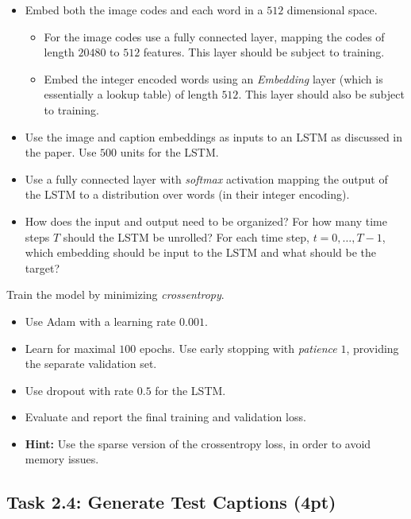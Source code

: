 \documentclass[a4paper,twoside,10pt]{article}
\begin{document}
\begin{itemize}
\item Embed both the image codes and each word in a $512$ dimensional space.
\begin{itemize}
\item For the image codes use a fully connected layer, mapping the codes of length $20480$ to $512$ features. This layer should be subject to training.
\item Embed the integer encoded words using an \emph{Embedding} layer (which is essentially a lookup table) of length $512$. This layer should also be subject to training.
\end{itemize}
\item Use the image and caption embeddings as inputs to an LSTM as discussed in the paper. Use $500$ units for the LSTM.
\item Use a fully connected layer with \emph{softmax} activation mapping the output of the LSTM to a distribution over words (in their integer encoding).
\item How does the input and output need to be organized? For how many time steps $T$ should the LSTM be unrolled? For each time step, $t = 0, \dots, T-1$, which embedding should be input to the LSTM and what should be the target?
\end{itemize}
\noindent
Train the model by minimizing \emph{crossentropy}.
\begin{itemize}
\item Use Adam with a learning rate $0.001$.
\item Learn for maximal $100$ epochs. Use early stopping with \emph{patience} $1$, providing the separate validation set.
\item Use dropout with rate $0.5$ for the LSTM.
\item Evaluate and report the final training and validation loss.
\item \textbf{Hint:} Use the sparse version of the crossentropy loss, in order to avoid memory issues.
\end{itemize}


\subsection*{Task 2.4: Generate Test Captions (4pt)}   
\end{document}
